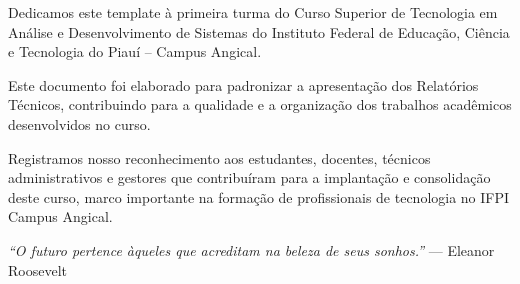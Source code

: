 \begin{agradecimentos}
Dedicamos este template à primeira turma do Curso Superior de Tecnologia em Análise e Desenvolvimento de Sistemas do Instituto Federal de Educação, Ciência e Tecnologia do Piauí -- Campus Angical.

Este documento foi elaborado para padronizar a apresentação dos Relatórios Técnicos, contribuindo para a qualidade e a organização dos trabalhos acadêmicos desenvolvidos no curso.

Registramos nosso reconhecimento aos estudantes, docentes, técnicos administrativos e gestores que contribuíram para a implantação e consolidação deste curso, marco importante na formação de profissionais de tecnologia no IFPI Campus Angical.

\textit{``O futuro pertence àqueles que acreditam na beleza de seus sonhos.''} --- Eleanor Roosevelt
\end{agradecimentos}
